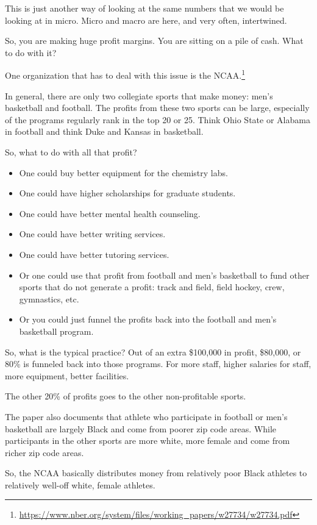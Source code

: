 \documentclass[
]{book}
\providecommand{\tightlist}{%
  \setlength{\itemsep}{0pt}\setlength{\parskip}{0pt}}
\begin{document}
This is just another way of looking at the same numbers that we would be looking at in micro. Micro and macro are here, and very often, intertwined.

So, you are making huge profit margins. You are sitting on a pile of cash. What to do with it?

One organization that has to deal with this issue is the NCAA.\footnote{\url{https://www.nber.org/system/files/working_papers/w27734/w27734.pdf}}

In general, there are only two collegiate sports that make money: men's basketball and football. The profits from these two sports can be large, especially of the programs regularly rank in the top 20 or 25. Think Ohio State or Alabama in football and think Duke and Kansas in basketball.

So, what to do with all that profit?

\begin{itemize}
\tightlist
\item
  One could buy better equipment for the chemistry labs.
\item
  One could have higher scholarships for graduate students.
\item
  One could have better mental health counseling.
\item
  One could have better writing services.
\item
  One could have better tutoring services.
\item
  Or one could use that profit from football and men's basketball to fund other sports that do not generate a profit: track and field, field hockey, crew, gymnastics, etc.
\item
  Or you could just funnel the profits back into the football and men's basketball program.
\end{itemize}

So, what is the typical practice? Out of an extra \$100,000 in profit, \$80,000, or 80\% is funneled back into those programs. For more staff, higher salaries for staff, more equipment, better facilities.

The other 20\% of profits goes to the other non-profitable sports.

The paper also documents that athlete who participate in football or men's basketball are largely Black and come from poorer zip code areas. While participants in the other sports are more white, more female and come from richer zip code areas.

So, the NCAA basically distributes money from relatively poor Black athletes to relatively well-off white, female athletes.
\end{document}

